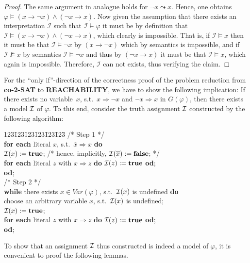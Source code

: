 \documentclass [11pt]{article}
\newcommand{\Ra}{\Rightarrow}
\renewcommand{\phi}{\varphi}
\def\II{{\cal I}}
\newcommand{\True}{\mathbf{true}}
\newcommand{\False}{\mathbf{false}}
\def\ox{\overline{x}}
\newcommand{\lto}{\rightarrow}
\newcommand{\nmodels}{\not\models}
\newcommand{\reach}{\leadsto}
\begin{document}
\begin{proof}
The same argument in analogue holds for $\neg x \reach x$. 
Hence, one obtains $\varphi \models  (x \lto \neg x) \land (\neg x \lto  x) $. Now given the assumption that there exists an interpretation $\mathcal{I}$ such that $\mathcal{I} \models \varphi$ it must be by definition that $\mathcal{I} \models  (x \lto \neg x) \land (\neg x \lto  x) $, which clearly is impossible. That is, if $\mathcal{I}\models x$ then it must be that  $\mathcal{I}\models \neg x$ by $(x \lto \neg x)$ which by semantics is impossible, and if  $\mathcal{I}\nmodels x$ by semantics $\mathcal{I}\models \neg x$ and thus by $(\neg x \lto  x)$ it must be that $\mathcal{I}\models x$, which again is impossible. Therefore, $\mathcal{I}$ can not exists, thus verifying the claim. 


\end{proof}


\newpage
\bigskip


\noindent
For the ``only if''-direction of the correctness proof of the 
problem reduction from {\bf co-2-SAT}
to {\bf REACHABILITY}, we have to show the following implication: If there exists no 
variable~$x$, s.t.\
$x \Ra  \neg x$ and $\neg x \Ra x$ in
$G(\phi)$, then there 
exists a model $\II$ of $\phi$.
To this end, consider the truth assignment $\II$ constructed by the following algorithm: 
%
%
\begin{tabbing}
123\=123\=123\=123\=123\=123\=\kill
/* Step 1 */  \\
{\bf for each} literal $x$, s.t.\ $\overline{x} \Ra x$ 
{\bf do} \\
\> $\II(x) := \True$;
 /* hence, implicitly, $\II(\ox) := \False$; */ \\
\> {\bf for each} literal $z$ with $x \Ra z$ 
{\bf do}  $\II(z) := \True$ {\bf od};
\\
{\bf od}; 
\\[1.1ex]
/* Step 2 */  \\
{\bf while} there exists $x \in Var(\phi)$, s.t.\ $\II(x)$ is undefined
{\bf do} \\
\> choose an arbitrary variable $x$, s.t.\ $\II(x)$ is undefined; \\
\> $\II(x) := \True$;  \\
\> {\bf for each} literal $z$ with $x \Ra z$ 
{\bf do}  $\II(z) := \True$ {\bf od};\\
{\bf od};
\end{tabbing}
%
%
To show that an assignment $\II$ thus constructed is indeed a 
model of $\phi$, it is convenient to proof the following lemmas.
\end{document}
